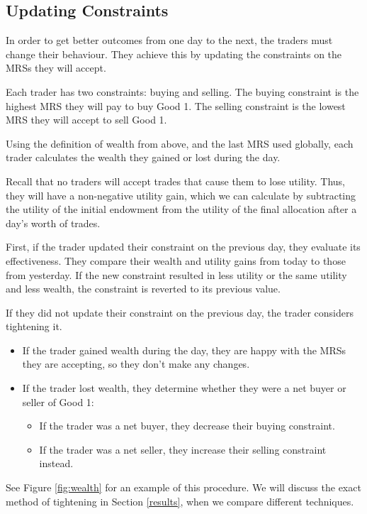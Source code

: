 \documentclass[12pt,a4paper,titlepage]{article}
\begin{document}
\subsection{Updating Constraints}
In order to get better outcomes from one day to the next, the traders must change their behaviour.
They achieve this by updating the constraints on the MRSs they will accept.

Each trader has two constraints: buying and selling.
The buying constraint is the highest MRS they will pay to buy Good 1.
The selling constraint is the lowest MRS they will accept to sell Good 1.

Using the definition of wealth from above, and the last MRS used globally, each trader calculates the wealth they gained or lost during the day.

Recall that no traders will accept trades that cause them to lose utility. 
Thus, they will have a non-negative utility gain, which we can calculate by subtracting the utility of the initial endowment from the utility of the final allocation after a day's worth of trades.

First, if the trader updated their constraint on the previous day, they evaluate its effectiveness.
They compare their wealth and utility gains from today to those from yesterday.
If the new constraint resulted in less utility or the same utility and less wealth, the constraint is reverted to its previous value.

If they did not update their constraint on the previous day, the trader considers tightening it.
\begin{itemize}
  \item If the trader gained wealth during the day, they are happy with the MRSs they are accepting, so they don't make any changes.
  \item If the trader lost wealth, they determine whether they were a net buyer or seller of Good 1:
    \begin{itemize}
      \item If the trader was a net buyer, they decrease their buying constraint.
      \item If the trader was a net seller, they increase their selling constraint instead.
    \end{itemize}
\end{itemize}

See Figure \ref{fig:wealth} for an example of this procedure.
We will discuss the exact method of tightening in Section \ref{results}, when we compare different techniques.
\end{document}
